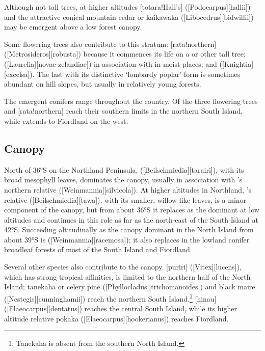 Although not tall trees, at higher altitudes [totara!Hall's] ([Podocarpus][hallii]) and the attractive conical mountain cedar or kaikawaka ([Libocedrus][bidwillii]) may be emergent above a low forest canopy.

Some flowering trees also contribute to this stratum: [rata!northern] ([Metrosideros][robusta]) because it commences its life on a  or other tall tree;  ([Laurelia][novae-zelandiae]) in association with  in moist places; and  ([Knightia][excelsa]).
The last with its distinctive `lombardy poplar' form is sometimes abundant on hill slopes, but usually in relatively young forests.

The emergent conifers range throughout the country.
Of the three flowering trees  and [rata!northern] reach their southern limits in the northern South Island, while  extends to Fiordland on the west.

\subsection{Canopy}

North of \ang{36}S on the Northland Peninsula,  ([Beilschmiedia][tarairi]), with its broad mesophyll leaves, dominates the canopy, usually in association with 's northern relative  ([Weinmannia][silvicola]).
At higher altitudes in Northland, 's relative  ([Beilschmiedia][tawa]), with its smaller, willow-like leaves, is a minor component of the canopy, but from about \ang{36}S it replaces  as the dominant at low altitudes and continues in this role as far as the north-east of the South Island at \ang{42}S.
Succeeding  altitudinally as the canopy dominant in the North Island from about \ang{39}S is  ([Weinmannia][racemosa]); it also replaces  in the lowland conifer broadleaf forests of most of the South Island and Fiordland.

Several other species also contribute to the canopy.
[puriri] ([Vitex][lucens]), which has strong tropical affinities, is limited to the northern half of the North Island; tanekaha or celery pine ([Phyllocladus][trichomanoides]) and black maire ([Nestegis][cunninghamii]) reach the northern South Island.\footnote{Tanekaha is absent from the southern North Island.}
[hinau] ([Elaeocarpus][dentatus]) reaches the central South Island, while its higher altitude relative pokaka ([Elaeocarpus][hookerianus]) reaches Fiordland.

